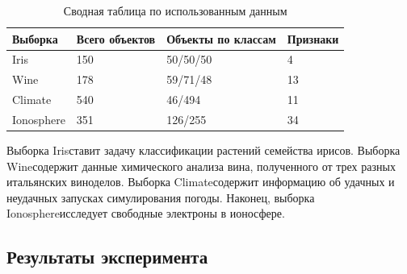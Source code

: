 \documentclass[12pt]{article}
\begin{document}
\begin{savenotes}
\begin{table}[!htbp]
  \begin{tabu}{X X[2] X[2] X}
    Выборка & Всего объектов & Объекты по классам & Признаки \\ \hline
    Iris\footnotemark[1] & 150 & 50/50/50 & 4   \\
    Wine\footnotemark[2] & 178 & 59/71/48 & 13  \\
    Climate\footnotemark[3] & 540 & 46/494   & 11  \\
    Ionosphere\footnotemark[4] & 351 & 126/255  & 34  \\
  \end{tabu}
  \caption{Сводная таблица по использованным данным}
  \label{tab:data}
\end{table}
\end{savenotes}

Выборка Iris\footnotemark[1] ставит задачу классификации растений
семейства ирисов. Выборка Wine\footnotemark[2] содержит данные
химического анализа вина, полученного от трех разных итальянских
виноделов. Выборка Climate\footnotemark[3] содержит информацию об
удачных и неудачных запусках симулирования погоды. Наконец, выборка
Ionosphere\footnotemark[4] исследует свободные электроны в ионосфере.


\subsection{Результаты эксперимента}
\end{document}
